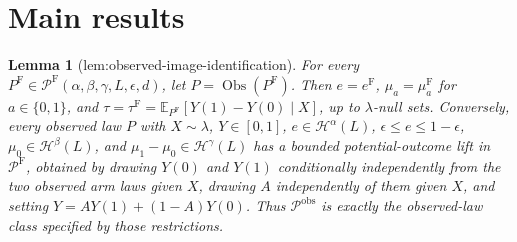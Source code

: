 \documentclass{article}
\newtheorem{lemma}{Lemma}
\begin{document}
\section{Main results}

\begin{lemma}[lem:observed-image-identification]\label{lem:observed-image-identification}
For every \(P^{\mathrm F}\in\mathcal P^{\mathrm F}(\alpha,\beta,\gamma,L,\epsilon,d)\), let \(P=\operatorname{Obs}(P^{\mathrm F})\). Then \(e=e^{\mathrm F}\), \(\mu_a=\mu_a^{\mathrm F}\) for \(a\in\{0,1\}\), and \(\tau=\tau^{\mathrm F}=\mathbb E_{P^{\mathrm F}}[Y(1)-Y(0)\mid X]\), up to \(\lambda\)-null sets. Conversely, every observed law \(P\) with \(X\sim\lambda\), \(Y\in[0,1]\), \(e\in\mathcal H^\alpha(L)\), \(\epsilon\le e\le1-\epsilon\), \(\mu_0\in\mathcal H^\beta(L)\), and \(\mu_1-\mu_0\in\mathcal H^\gamma(L)\) has a bounded potential-outcome lift in \(\mathcal P^{\mathrm F}\), obtained by drawing \(Y(0)\) and \(Y(1)\) conditionally independently from the two observed arm laws given \(X\), drawing \(A\) independently of them given \(X\), and setting \(Y=AY(1)+(1-A)Y(0)\). Thus \(\mathcal P^{\mathrm{obs}}\) is exactly the observed-law class specified by those restrictions.
\end{lemma}
\end{document}
